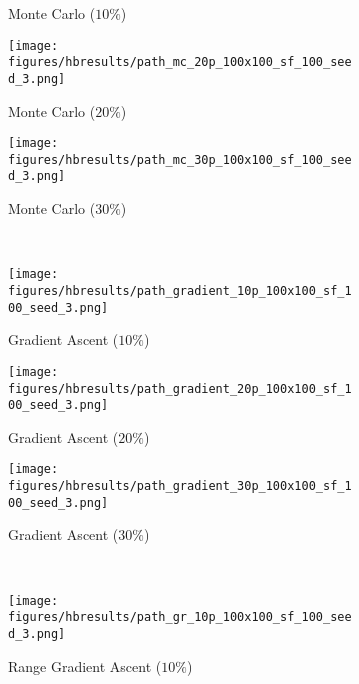 \begin{figure}[htb!]
\begin{subfigure}[t]{0.32\textwidth}
        \ssp
        \captionsetup{skip=0.20\baselineskip,size=footnotesize}
        \caption{Monte Carlo ($10\%$)}
    \end{subfigure}%
    \begin{subfigure}[t]{0.32\textwidth}
        \centering
        \texttt{[image: figures/hbresults/path\_mc\_20p\_100x100\_sf\_100\_seed\_3.png]}
        \ssp
        \captionsetup{skip=0.20\baselineskip,size=footnotesize}
        \caption{Monte Carlo ($20\%$)}
    \end{subfigure}%
    \begin{subfigure}[t]{0.32\textwidth}
        \centering
        \texttt{[image: figures/hbresults/path\_mc\_30p\_100x100\_sf\_100\_seed\_3.png]}
        \ssp
        \captionsetup{skip=0.20\baselineskip,size=footnotesize}
        \caption{Monte Carlo ($30\%$)}
    \end{subfigure}%
    \\
    \begin{subfigure}[t]{0.32\textwidth}
        \centering
        \texttt{[image: figures/hbresults/path\_gradient\_10p\_100x100\_sf\_100\_seed\_3.png]}
        \ssp
        \captionsetup{skip=0.20\baselineskip,size=footnotesize}
        \caption{Gradient Ascent ($10\%$)}
    \end{subfigure}%
    \begin{subfigure}[t]{0.32\textwidth}
        \centering
        \texttt{[image: figures/hbresults/path\_gradient\_20p\_100x100\_sf\_100\_seed\_3.png]}
        \ssp
        \captionsetup{skip=0.20\baselineskip,size=footnotesize}
        \caption{Gradient Ascent ($20\%$)}
    \end{subfigure}%
    \begin{subfigure}[t]{0.32\textwidth}
        \centering
        \texttt{[image: figures/hbresults/path\_gradient\_30p\_100x100\_sf\_100\_seed\_3.png]}
        \ssp
        \captionsetup{skip=0.20\baselineskip,size=footnotesize}
        \caption{Gradient Ascent ($30\%$)}
    \end{subfigure}%
    \\
    \begin{subfigure}[t]{0.32\textwidth}
        \centering
        \texttt{[image: figures/hbresults/path\_gr\_10p\_100x100\_sf\_100\_seed\_3.png]}
        \ssp
        \captionsetup{skip=0.20\baselineskip,size=footnotesize}
        \caption{Range Gradient Ascent ($10\%$)}
    \end{subfigure}%
    \begin{subfigure}[t]{0.32\textwidth}

\end{subfigure}
\end{figure}
